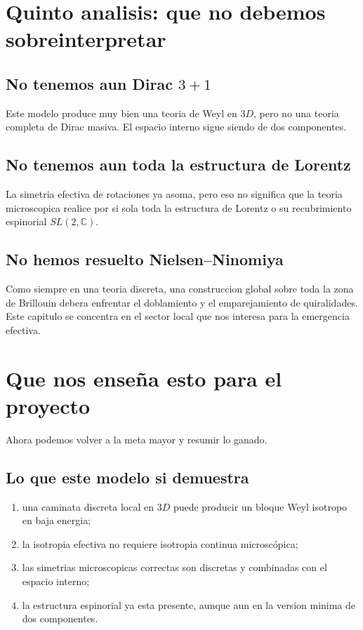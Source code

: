 \section{Quinto analisis: que no debemos sobreinterpretar}
\subsection{No tenemos aun Dirac \(3+1\)}
Este modelo produce muy bien una teoria de Weyl en \(3D\), pero no una teoria completa de Dirac masiva. El espacio interno sigue siendo de dos componentes.

\subsection{No tenemos aun toda la estructura de Lorentz}
La simetria efectiva de rotaciones ya asoma, pero eso no significa que la teoria microscopica realice por si sola toda la estructura de Lorentz o su recubrimiento espinorial \(SL(2,\mathbb{C})\).

\subsection{No hemos resuelto Nielsen--Ninomiya}
Como siempre en una teoria discreta, una construccion global sobre toda la zona de Brillouin debera enfrentar el doblamiento y el emparejamiento de quiralidades. Este capitulo se concentra en el sector local que nos interesa para la emergencia efectiva.

\section{Que nos ense\~na esto para el proyecto}
Ahora podemos volver a la meta mayor y resumir lo ganado.

\subsection{Lo que este modelo si demuestra}
\begin{enumerate}[label=\arabic*.]
    \item una caminata discreta local en \(3D\) puede producir un bloque Weyl isotropo en baja energia;
    \item la isotropia efectiva no requiere isotropia continua microscópica;
    \item las simetrias microscopicas correctas son discretas y combinadas con el espacio interno;
    \item la estructura espinorial ya esta presente, aunque aun en la version minima de dos componentes.
\end{enumerate}

